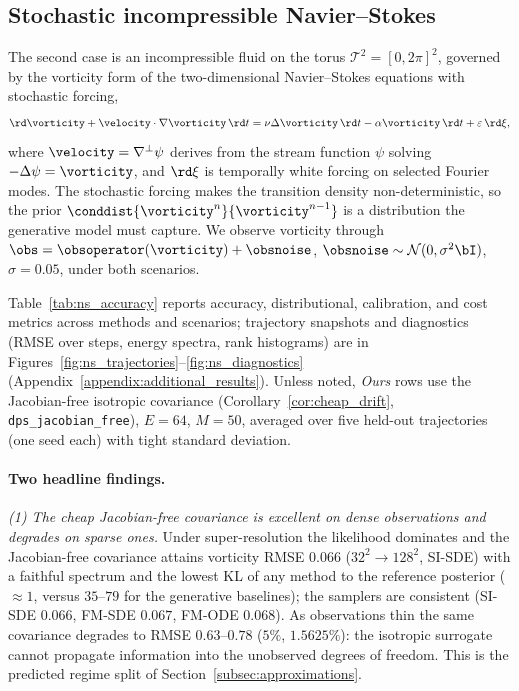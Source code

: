 \subsection{Stochastic incompressible Navier--Stokes}
\label{subsec:results_ns}
The second case is an incompressible fluid on the torus $\mathcal{T}^2=[0,2\pi]^2$, governed by the vorticity form of the two-dimensional Navier--Stokes equations with stochastic forcing,
\begin{align}\label{eq:ns_equation}
    \rd\vorticity + \velocity\cdot\nabla\vorticity\,\rd t
    = \nu\Delta\vorticity\,\rd t - \alpha\vorticity\,\rd t + \varepsilon\,\rd\xi,
\end{align}
where $\velocity=\nabla^\perp\psi$ derives from the stream function $\psi$ solving $-\Delta\psi=\vorticity$, and $\rd\xi$ is temporally white forcing on selected Fourier modes. The stochastic forcing makes the transition density non-deterministic, so the prior $\conddist{\vorticity^{n}}{\vorticity^{n-1}}$ is a distribution the generative model must capture. We observe vorticity through $\obs=\obsoperator(\vorticity)+\obsnoise$, $\obsnoise\sim\mathcal{N}(0,\sigma^2\bI)$, $\sigma=0.05$, under both scenarios.

Table~\ref{tab:ns_accuracy} reports accuracy, distributional, calibration, and cost metrics across methods and scenarios; trajectory snapshots and diagnostics (RMSE over steps, energy spectra, rank histograms) are in Figures~\ref{fig:ns_trajectories}--\ref{fig:ns_diagnostics} (Appendix~\ref{appendix:additional_results}). Unless noted, \emph{Ours} rows use the Jacobian-free isotropic covariance (Corollary~\ref{cor:cheap_drift}, \texttt{dps\_jacobian\_free}), $E=64$, $M=50$, averaged over five held-out trajectories (one seed each) with tight standard deviation.

\paragraph{Two headline findings.}
\emph{(1) The cheap Jacobian-free covariance is excellent on dense observations and degrades on sparse ones.} Under super-resolution the likelihood dominates and the Jacobian-free covariance attains vorticity RMSE $0.066$ ($32^2\!\to\!128^2$, SI-SDE) with a faithful spectrum and the lowest KL of any method to the reference posterior ($\approx1$, versus $35$--$79$ for the generative baselines); the samplers are consistent (SI-SDE $0.066$, FM-SDE $0.067$, FM-ODE $0.068$). As observations thin the same covariance degrades to RMSE $0.63$--$0.78$ ($5\%$, $1.5625\%$): the isotropic surrogate cannot propagate information into the unobserved degrees of freedom. This is the predicted regime split of Section~\ref{subsec:approximations}.


